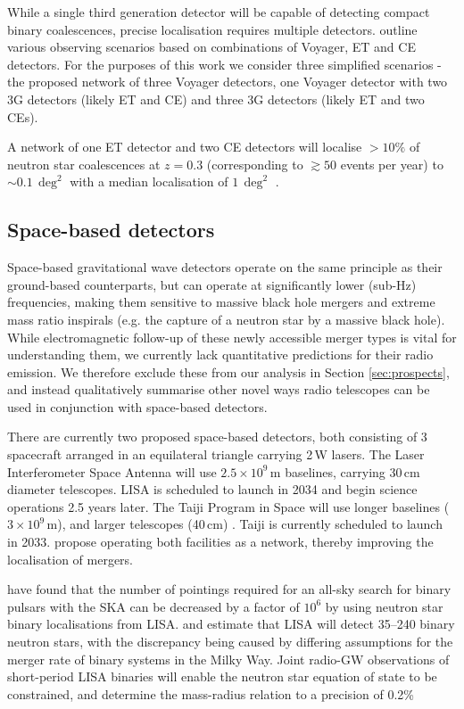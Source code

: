 While a single third generation detector will be capable of detecting compact binary coalescences, precise localisation requires multiple detectors. \citet{2019CQGra..36v5002H} outline various observing scenarios based on combinations of Voyager, ET and CE detectors. For the purposes of this work we consider three simplified scenarios - the proposed network of three Voyager detectors, one Voyager detector with two 3G detectors (likely ET and CE) and three 3G detectors (likely ET and two CEs).


A network of one ET detector and two CE detectors will localise $>10\%$ of neutron star coalescences at $z=0.3$ (corresponding to $\gtrsim 50$ events per year) to $\sim 0.1\,\deg^2$ with a median localisation of $1\,\deg^2$ \citep{2019CQGra..36v5002H}.




\subsection{Space-based detectors}
Space-based gravitational wave detectors operate on the same principle as their ground-based counterparts, but can operate at significantly lower (sub-Hz) frequencies, making them sensitive to massive black hole mergers and extreme mass ratio inspirals (e.g. the capture of a neutron star by a massive black hole). While electromagnetic follow-up of these newly accessible merger types is vital for understanding them, we currently lack quantitative predictions for their radio emission. We therefore exclude these from our analysis in Section \ref{sec:prospects}, and instead qualitatively summarise other novel ways radio telescopes can be used in conjunction with space-based detectors.

There are currently two proposed space-based detectors, both consisting of 3 spacecraft arranged in an equilateral triangle carrying 2\,W lasers. The Laser Interferometer Space Antenna \citep{2017arXiv170200786A} will use $2.5\times 10^9$\,m baselines, carrying 30\,cm diameter telescopes. LISA is scheduled to launch in 2034 and begin science operations 2.5 years later. The Taiji Program in Space \citep{10.1093/nsr/nwx116} will use longer baselines ($3\times 10^9$\,m), and larger telescopes (40\,cm) \citep{2018arXiv180709495R}. Taiji is currently scheduled to launch in 2033. \citet{2020NatAs...4..108R} propose operating both facilities as a network, thereby improving the localisation of mergers.

\pagebreak
\citet{2019MNRAS.483.2615K} have found that the number of pointings required for an all-sky search for binary pulsars with the SKA can be decreased by a factor of $10^6$ by using neutron star binary localisations from LISA. \citet{2020MNRAS.492.3061L} and \citet{2020ApJ...892L...9A} estimate that LISA will detect 35--240 binary neutron stars, with the discrepancy being caused by differing assumptions for the merger rate of binary systems in the Milky Way. Joint radio-GW observations of short-period LISA binaries will enable the neutron star equation of state to be constrained, and determine the mass-radius relation to a precision of 0.2\% \citep{2020MNRAS.493.5408T}

